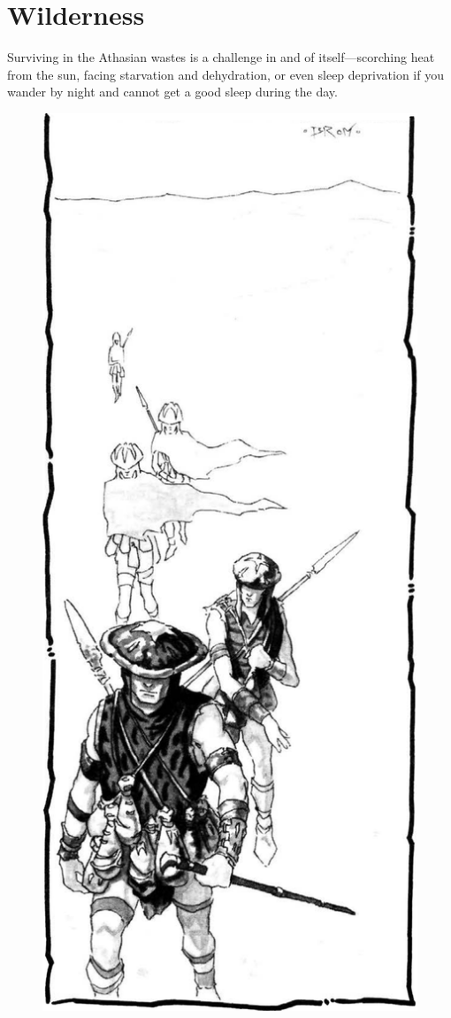 \section{Wilderness}
Surviving in the Athasian wastes is a challenge in and of itself---scorching heat from the sun, facing starvation and dehydration, or even sleep deprivation if you wander by night and cannot get a good sleep during the day.

\begin{figure}[t!]
\centering
\includegraphics[width=\columnwidth]{images/exploring-1.png}
\WOTC
\end{figure}

